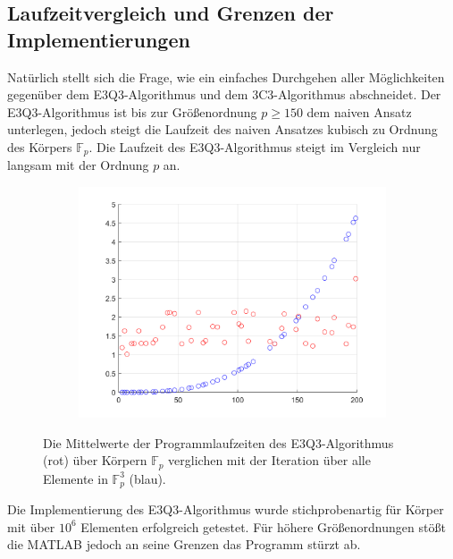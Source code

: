\documentclass[a4paper,oneside, 11pt, openany%
]{article}
\newcommand{\F}[1]{\mathbb{F}_{#1}}
\theoremstyle{custom}
\theoremstyle{custom}
\begin{document}
	\subsection{Laufzeitvergleich und Grenzen der Implementierungen}
	Natürlich stellt sich die Frage, wie ein einfaches Durchgehen aller Möglichkeiten gegenüber dem E3Q3-Algorithmus und dem 3C3-Algorithmus abschneidet.
	Der E3Q3-Algorithmus ist bis zur Größenordnung $p \geq 150$ dem naiven Ansatz unterlegen, jedoch steigt die Laufzeit des naiven Ansatzes kubisch zu Ordnung des Körpers $\F{p}$. Die Laufzeit des E3Q3-Algorithmus steigt im Vergleich nur langsam mit der Ordnung $p$ an.
	\begin{figure}[H]
		\begin{subfigure}[b]{0.7\textwidth}
			\includegraphics[width=\textwidth]{"images/runtime_e3q3_for_loop.png"}
		\end{subfigure}
			\caption{Die Mittelwerte der Programmlaufzeiten des E3Q3-Algorithmus (rot) über Körpern $\F{p}$ verglichen mit der Iteration über alle Elemente in $\F{p}^3$ (blau).}
	\end{figure}
	Die Implementierung des E3Q3-Algorithmus wurde stichprobenartig für Körper mit über $10^6$ Elementen erfolgreich getestet. Für höhere Größenordnungen stößt die MATLAB jedoch an seine Grenzen das Programm stürzt ab.
\end{document}
